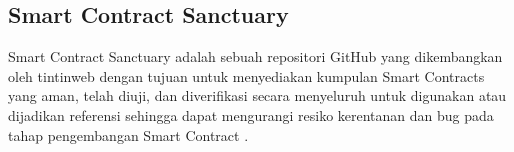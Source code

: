 \subsection{Smart Contract Sanctuary}
\label{subsec:sc-sanctuary}

Smart Contract Sanctuary adalah sebuah repositori GitHub yang dikembangkan oleh tintinweb dengan tujuan untuk menyediakan kumpulan Smart Contracts yang aman, telah diuji, dan diverifikasi secara menyeluruh untuk digunakan atau dijadikan referensi sehingga dapat mengurangi resiko kerentanan dan bug pada tahap pengembangan Smart Contract \parencite{smart_contract_sanctuary}. 